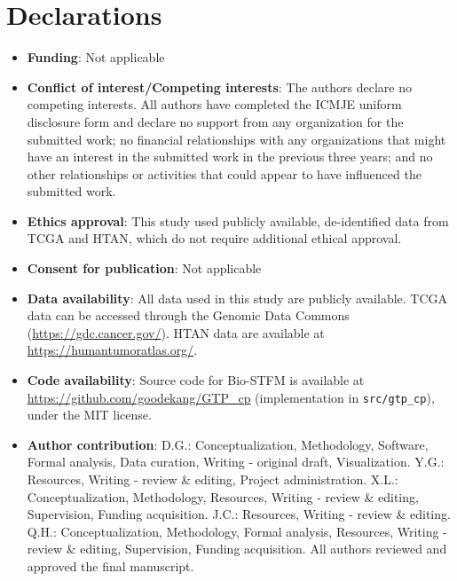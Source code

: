 \documentclass[pdflatex,sn-nature]{sn-jnl}%
\theoremstyle{thmstyleone}%
\theoremstyle{thmstyletwo}%
\theoremstyle{thmstylethree}%
\begin{document}


\section*{Declarations}

\begin{itemize}
\item \textbf{Funding}: Not applicable
\item \textbf{Conflict of interest/Competing interests}: The authors declare no competing interests. All authors have completed the ICMJE uniform disclosure form and declare no support from any organization for the submitted work; no financial relationships with any organizations that might have an interest in the submitted work in the previous three years; and no other relationships or activities that could appear to have influenced the submitted work.
\item \textbf{Ethics approval}: This study used publicly available, de-identified data from TCGA and HTAN, which do not require additional ethical approval.
\item \textbf{Consent for publication}: Not applicable
\item \textbf{Data availability}: All data used in this study are publicly available. TCGA data can be accessed through the Genomic Data Commons (\url{https://gdc.cancer.gov/}). HTAN data are available at \url{https://humantumoratlas.org/}.
\item \textbf{Code availability}: Source code for Bio-STFM is available at \url{https://github.com/goodekang/GTP_cp} (implementation in \texttt{src/gtp\_cp}), under the MIT license.
\item \textbf{Author contribution}: D.G.: Conceptualization, Methodology, Software, Formal analysis, Data curation, Writing - original draft, Visualization. Y.G.: Resources, Writing - review \& editing, Project administration. X.L.: Conceptualization, Methodology, Resources, Writing - review \& editing, Supervision, Funding acquisition. J.C.: Resources, Writing - review \& editing. Q.H.: Conceptualization, Methodology, Formal analysis, Resources, Writing - review \& editing, Supervision, Funding acquisition. All authors reviewed and approved the final manuscript.
\end{itemize}


\end{document}
